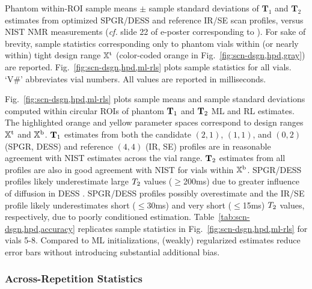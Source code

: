 \begin{table*} [t]
	\caption{
		Phantom within-ROI sample means $\pm$ sample standard deviations 
		of $\mathbf{T}_1$ and $\mathbf{T}_2$ estimates 
		from optimized SPGR/DESS and reference IR/SE scan profiles, 
		versus NIST NMR measurements (\emph{cf.} slide 22 
		of e-poster corresponding to \cite{keenan:16:msm}).
		For sake of brevity, 
		sample statistics corresponding only to phantom vials 
		within (or nearly within) tight design range $\mathbb{X}^\mathrm{t}$ 
		(color-coded orange in Fig.~\ref{fig:scn-dsgn,hpd,gray}) are reported. 
		Fig.~\ref{fig:scn-dsgn,hpd,ml-rls} plots sample statistics for all vials.
		`V\#' abbreviates vial numbers. 
		All values are reported in milliseconds.
	}
	\label{tab:scn-dsgn,hpd,accuracy}
\end{table*}

Fig.~\ref{fig:scn-dsgn,hpd,ml-rls} plots 
sample means and sample standard deviations 
computed within circular ROIs 
of phantom $\mathbf{T}_1$ and $\mathbf{T}_2$ ML and RL estimates.
The highlighted orange and yellow parameter spaces 
correspond to design ranges $\mathbb{X}^\mathrm{t}$ and $\mathbb{X}^\mathrm{b}$.
$\mathbf{T}_1$ estimates from both 
the candidate $(2,1)$, $(1,1)$, and $(0,2)$ (SPGR, DESS) 
and reference $(4,4)$ (IR, SE) profiles 
are in reasonable agreement 
with NIST estimates \cite{keenan:16:msm} 
across the vial range.
$\mathbf{T}_2$ estimates from all profiles are also 
in good agreement with NIST 
for vials within $\mathbb{X}^\mathrm{b}$.
SPGR/DESS profiles likely underestimate large $T_2$ values ($\ge$200ms) 
due to greater influence of diffusion in DESS 
\cite{carney:91:asa, wu:90:eod, kaiser:74:daf}.
SPGR/DESS profiles possibly overestimate 
and the IR/SE profile likely underestimates 
short ($\le$30ms) and very short ($\le$15ms) $T_2$ values, 
respectively, 
due to poorly conditioned estimation. 
Table~\ref{tab:scn-dsgn,hpd,accuracy} replicates sample statistics 
in Fig.~\ref{fig:scn-dsgn,hpd,ml-rls} for vials 5-8.
Compared to ML initializations, 
(weakly) regularized estimates reduce error bars 
without introducing substantial additional bias.

\subsubsection{Across-Repetition Statistics} 
\label{sss,scn-dsgn,exp,phant,rep}

